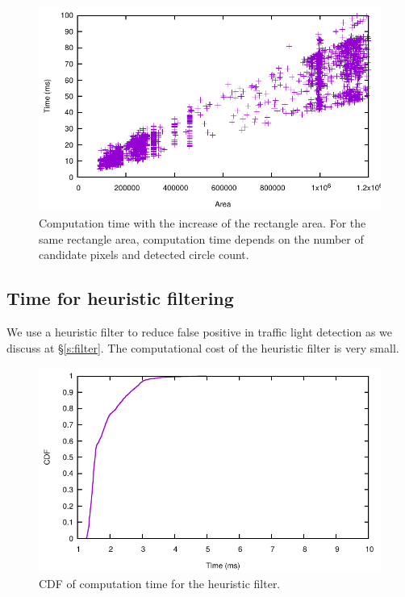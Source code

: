 \begin{figure}[h!]
\centering
\includegraphics[width=5.2in]{plots/cloudy_recarea.pdf}
\caption{Computation time with the increase of the rectangle area. For the same rectangle area, computation time depends on the number of candidate pixels and detected circle count.}
\label{f:recarea}
\end{figure}



\subsection{Time for heuristic filtering}
We use a heuristic filter to reduce false positive in traffic light detection as we discuss at \S\ref{s:filter}.
The computational cost of the heuristic filter is very small.

\begin{figure}[h!]
\centering
\includegraphics[width=5.2in]{plots/sunny_cdf_filter.pdf}
\caption{CDF of computation time for the heuristic filter.}
\label{f:cdf_fil}
\end{figure}


